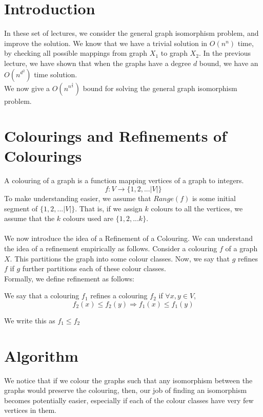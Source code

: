 
\section{Introduction}
In these set of lectures, we consider the general graph isomorphism problem, and improve the solution. We know that we have a trivial solution in $O(n^n)$ time, by checking all possible mappings from graph $X_1$ to graph $X_2$. In the previous lecture, we have shown that when the graphs have a degree $d$ bound, we have an $O(n^{d^2})$ time solution.
\\We now give a $O(n^{n^{\frac{2}{3}}})$ bound for solving the general graph isomorphism problem.

\section{Colourings and Refinements of Colourings}
A colouring of a graph is a function mapping vertices of a graph to integers.
\[
f: V \longrightarrow \{1, 2, ... |V|\}
\]
To make understanding easier, we assume that $Range(f)$ is some initial segment of $\{1, 2, ... |V|\}$. That is, if we assign $k$ colours to all the vertices, we assume that the $k$ colours used are $\{1, 2, ... k\}$.
\paragraph*{}
We now introduce the idea of a Refinement of a Colouring. We can understand the idea of a refinement empirically as follows. Consider a colouring $f$ of a graph $X$. This partitions the graph into some colour classes. Now, we say that $g$ refines $f$ if $g$ further partitions each of these colour classes. 
\\Formally, we define refinement as follows:
\begin{definition}
We say that a colouring $f_1$ refines a colouring $f_2$ if $\forall x, y \in V$,
\[
f_2(x) \le f_2(y) \Rightarrow f_1(x) \le f_1(y)
\]  
\end{definition}
We write this as $f_1 \le f_2$
\section{Algorithm}

We notice that if we colour the graphs such that any isomorphism between the graphs would preserve the colouring, then, our job of finding an isomorphism becomes potentially easier, especially if each of the colour classes have very few vertices in them.
